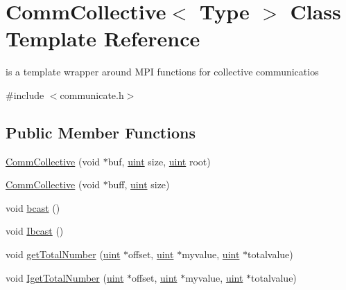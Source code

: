 \hypertarget{classCommCollective}{}\section{Comm\+Collective$<$ Type $>$ Class Template Reference}
\label{classCommCollective}


is a template wrapper around M\+PI functions for collective communicatios  




{\ttfamily \#include $<$communicate.\+h$>$}

\subsection*{Public Member Functions}
\begin{DoxyCompactItemize}
\item 
\mbox{\hyperlink{classCommCollective_ad583efe49e3dd7883f76dcb82b34cebb}{Comm\+Collective}} (void $\ast$buf, \mbox{\hyperlink{definitions_8h_a69aa29b598b851b0640aa225a9e5d61d}{uint}} size, \mbox{\hyperlink{definitions_8h_a69aa29b598b851b0640aa225a9e5d61d}{uint}} root)
\item 
\mbox{\hyperlink{classCommCollective_a9315504a2e5e83cb04f3b8e80b7ff3d5}{Comm\+Collective}} (void $\ast$buff, \mbox{\hyperlink{definitions_8h_a69aa29b598b851b0640aa225a9e5d61d}{uint}} size)
\item 
void \mbox{\hyperlink{classCommCollective_a438805e16ba8c74b0682a0bf27b4b0f3}{bcast}} ()
\item 
void \mbox{\hyperlink{classCommCollective_af79e85456fe4bf007ccb6ad0c7e41151}{Ibcast}} ()
\item 
void \mbox{\hyperlink{classCommCollective_a2a300899ded8e81afa840f06497716f9}{get\+Total\+Number}} (\mbox{\hyperlink{definitions_8h_a69aa29b598b851b0640aa225a9e5d61d}{uint}} $\ast$offset, \mbox{\hyperlink{definitions_8h_a69aa29b598b851b0640aa225a9e5d61d}{uint}} $\ast$myvalue, \mbox{\hyperlink{definitions_8h_a69aa29b598b851b0640aa225a9e5d61d}{uint}} $\ast$totalvalue)
\item 
void \mbox{\hyperlink{classCommCollective_a0b8611d0fce41f5b6629ebf702e7aa4b}{Iget\+Total\+Number}} (\mbox{\hyperlink{definitions_8h_a69aa29b598b851b0640aa225a9e5d61d}{uint}} $\ast$offset, \mbox{\hyperlink{definitions_8h_a69aa29b598b851b0640aa225a9e5d61d}{uint}} $\ast$myvalue, \mbox{\hyperlink{definitions_8h_a69aa29b598b851b0640aa225a9e5d61d}{uint}} $\ast$totalvalue)
\item 

\end{DoxyCompactItemize}
